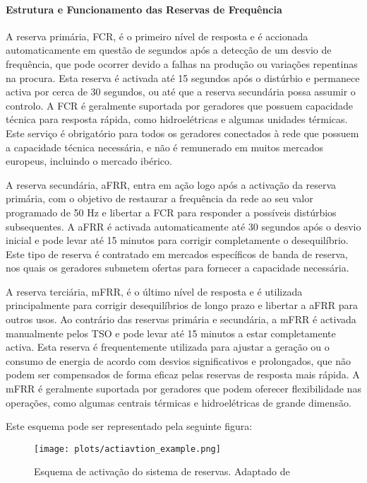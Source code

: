 \paragraph{Estrutura e Funcionamento das Reservas de Frequência \label{se:reservas_freq}}
\text{ }  \par


A reserva primária, \gls{FCR}, é o primeiro nível de resposta e é accionada automaticamente em questão de segundos após a detecção de um desvio de frequência, que pode ocorrer devido a falhas na produção ou variações repentinas na procura. Esta reserva é activada até 15 segundos após o distúrbio e permanece activa por cerca de 30 segundos, ou até que a reserva secundária possa assumir o controlo. A \gls{FCR} é geralmente suportada por geradores que possuem capacidade técnica para resposta rápida, como hidroelétricas e algumas unidades térmicas. Este serviço é obrigatório para todos os geradores conectados à rede que possuem a capacidade técnica necessária, e não é remunerado em muitos mercados europeus, incluindo o mercado ibérico.\par
A reserva secundária, \gls{aFRR}, entra em ação logo após a activação da reserva primária, com o objetivo de restaurar a frequência da rede ao seu valor programado de 50 Hz e libertar a \gls{FCR} para responder a possíveis distúrbios subsequentes. A \gls{aFRR} é activada automaticamente até 30 segundos após o desvio inicial e pode levar até 15 minutos para corrigir completamente o desequilíbrio. Este tipo de reserva é contratado em mercados específicos de banda de reserva, nos quais os geradores submetem ofertas para fornecer a capacidade necessária.\par
A reserva terciária, \gls{mFRR}, é o último nível de resposta e é utilizada principalmente para corrigir desequilíbrios de longo prazo e libertar a \gls{aFRR} para outros usos. Ao contrário das reservas primária e secundária, a \gls{mFRR} é activada manualmente pelos \gls{TSO} e pode levar até 15 minutos a estar completamente activa. Esta reserva é frequentemente utilizada para ajustar a geração ou o consumo de energia de acordo com desvios significativos e prolongados, que não podem ser compensados de forma eficaz pelas reservas de resposta mais rápida. A \gls{mFRR} é geralmente suportada por geradores que podem oferecer flexibilidade nas operações, como algumas centrais térmicas e hidroelétricas de grande dimensão.\par

Este esquema pode ser representado pela seguinte figura:\par
\begin{figure}[H]
  \centering
  \texttt{[image: plots/actiavtion\_example.png]}
  \caption{Esquema de activação do sistema de reservas. Adaptado de \cite{handbook2009policy}}
  \label{fig:targettimeserieswindows}
\end{figure}

